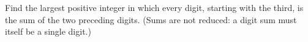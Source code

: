 Find the largest positive integer in which every digit, starting with the third, is the sum of the two preceding digits. (Sums are not reduced: a digit sum must itself be a single digit.)
